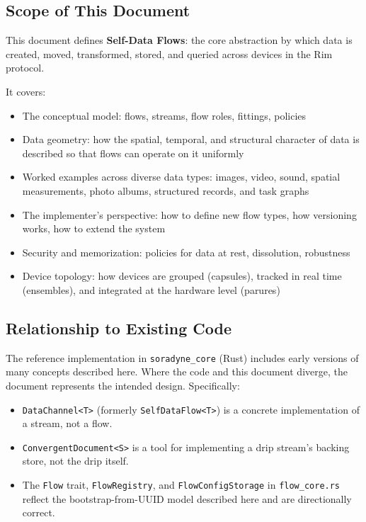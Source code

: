 \documentclass[11pt, letterpaper]{article}
\begin{document}
\subsection{Scope of This Document}

This document defines \textbf{Self-Data Flows}: the core abstraction by which data is
created, moved, transformed, stored, and queried across devices in the Rim protocol.

It covers:
\begin{itemize}[leftmargin=2em]
  \item The conceptual model: flows, streams, flow roles, fittings, policies
  \item Data geometry: how the spatial, temporal, and structural character of data
    is described so that flows can operate on it uniformly
  \item Worked examples across diverse data types: images, video, sound, spatial
    measurements, photo albums, structured records, and task graphs
  \item The implementer's perspective: how to define new flow types, how versioning
    works, how to extend the system
  \item Security and memorization: policies for data at rest, dissolution, robustness
  \item Device topology: how devices are grouped (capsules), tracked in real time
    (ensembles), and integrated at the hardware level (parures)
\end{itemize}

\subsection{Relationship to Existing Code}

The reference implementation in \texttt{soradyne\_core} (Rust) includes early versions of
many concepts described here. Where the code and this document diverge, the document
represents the intended design. Specifically:

\begin{itemize}[leftmargin=2em]
  \item \texttt{DataChannel<T>} (formerly \texttt{SelfDataFlow<T>}) is a concrete
    implementation of a stream, not a flow.
  \item \texttt{ConvergentDocument<S>} is a tool for implementing a drip stream's
    backing store, not the drip itself.
  \item The \texttt{Flow} trait, \texttt{FlowRegistry}, and \texttt{FlowConfigStorage}
    in \texttt{flow\_core.rs} reflect the bootstrap-from-UUID model described here and
    are directionally correct.
\end{itemize}
\end{document}
